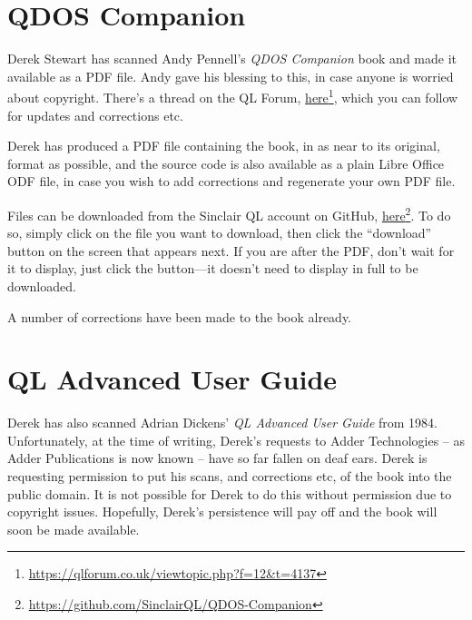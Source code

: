 \section{QDOS Companion}

Derek Stewart has scanned Andy Pennell's \emph{QDOS Companion} book
and made it available as a PDF file. Andy gave his blessing to this,
in case anyone is worried about copyright. There's a thread on the
QL Forum, \href{https://qlforum.co.uk/viewtopic.php?f=12&t=4137}{here}\footnote{\url{https://qlforum.co.uk/viewtopic.php?f=12\&t=4137}},
which you can follow for updates and corrections etc.

Derek has produced a PDF file containing the book, in as near to its
original, format as possible, and the source code is also available
as a plain Libre Office ODF file, in case you wish to add corrections
and regenerate your own PDF file.

Files can be downloaded from the Sinclair QL account on GitHub, \href{https://github.com/SinclairQL/QDOS-Companion}{here}\footnote{\url{https://github.com/SinclairQL/QDOS-Companion}}.
To do so, simply click on the file you want to download, then click
the ``download'' button on the screen that appears next. If you
are after the PDF, don't wait for it to display, just click the button---it 
doesn't need to display in full to be downloaded.

A number of corrections have been made to the book already.

\section{QL Advanced User Guide}

Derek has also scanned Adrian Dickens' \emph{QL Advanced User Guide}
from 1984. Unfortunately, at the time of writing, Derek's requests
to Adder Technologies -- as Adder Publications is now known -- have
so far fallen on deaf ears. Derek is requesting permission to put
his scans, and corrections etc, of the book into the public domain.
It is not possible for Derek to do this without permission due to
copyright issues. Hopefully, Derek's persistence will pay off and
the book will soon be made available.
